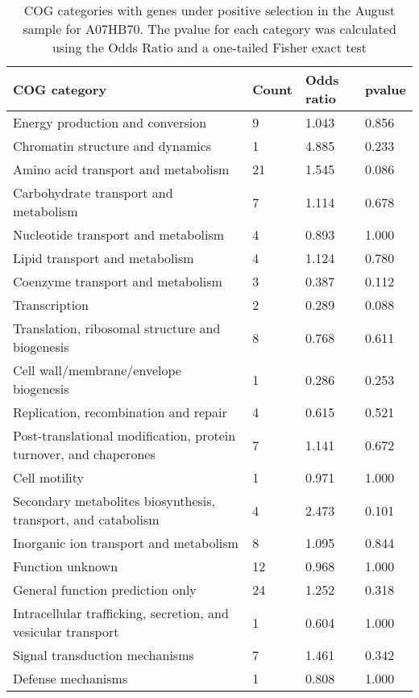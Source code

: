 \begin{table}[hb]
\footnotesize 
	\tabcolsep=0.11cm 
\caption{COG categories with genes under positive selection in the August sample for A07HB70. The pvalue for each category was calculated using the Odds Ratio and a one-tailed Fisher exact test \\} 
\begin{tabularx}{\textwidth}{L{6cm}R{2cm}R{2cm}R{2cm}} 
\hline 
\textbf{COG category} & \textbf{Count} & \textbf{Odds ratio} & \textbf{pvalue} \\ 
\hline 
Energy production and conversion & 9 & 1.043 & 0.856 \\ 
Chromatin structure and dynamics & 1 & 4.885 & 0.233 \\ 
Amino acid transport and metabolism & 21 & 1.545 & 0.086 \\ 
Carbohydrate transport and metabolism & 7 & 1.114 & 0.678 \\ 
Nucleotide transport and metabolism & 4 & 0.893 & 1.000 \\ 
Lipid transport and metabolism & 4 & 1.124 & 0.780 \\ 
Coenzyme transport and metabolism & 3 & 0.387 & 0.112 \\ 
Transcription & 2 & 0.289 & 0.088 \\ 
Translation, ribosomal structure and biogenesis & 8 & 0.768 & 0.611 \\ 
Cell wall/membrane/envelope biogenesis & 1 & 0.286 & 0.253 \\ 
Replication, recombination and repair & 4 & 0.615 & 0.521 \\ 
Post-translational modification, protein turnover, and chaperones & 7 & 1.141 & 0.672 \\ 
Cell motility & 1 & 0.971 & 1.000 \\ 
Secondary metabolites biosynthesis, transport, and catabolism & 4 & 2.473 & 0.101 \\ 
Inorganic ion transport and metabolism & 8 & 1.095 & 0.844 \\ 
Function unknown & 12 & 0.968 & 1.000 \\ 
General function prediction only & 24 & 1.252 & 0.318 \\ 
Intracellular trafficking, secretion, and vesicular transport & 1 & 0.604 & 1.000 \\ 
Signal transduction mechanisms & 7 & 1.461 & 0.342 \\ 
Defense mechanisms & 1 & 0.808 & 1.000 \\ 
\end{tabularx} 
\label{August_COG_Selection_A07HB70} 
 \end{table} 

